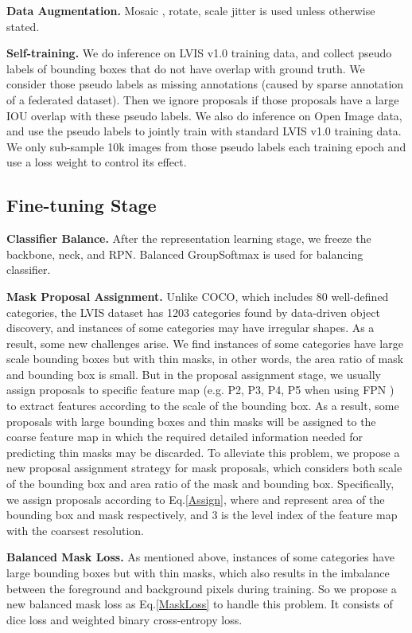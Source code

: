 \documentclass[runningheads]{llncs}
\begin{document}
 \noindent \textbf{Data Augmentation.} Mosaic \cite{bochkovskiy2020yolov4}, rotate, scale jitter is used unless otherwise stated.
 
 \noindent \textbf{Self-training.} 
 We do inference on LVIS v1.0 training data, and collect pseudo labels of bounding boxes that do not have overlap with ground truth. We consider those pseudo labels as missing annotations (caused by sparse annotation of a federated dataset). Then we ignore proposals if those proposals have a large IOU overlap with these pseudo labels. We also do inference on Open Image data, and use the pseudo labels to jointly train with standard LVIS v1.0 training data. We only sub-sample 10k images from those pseudo labels each training epoch and use a loss weight  to control its effect.
 
 \subsection{Fine-tuning Stage}
 
 \noindent \textbf{Classifier Balance.} After the representation learning stage, we freeze the backbone, neck, and RPN. Balanced GroupSoftmax \cite{li2020overcoming} is used for balancing classifier.
 
 \noindent \textbf{Mask Proposal Assignment.}  Unlike COCO, which includes 80 well-defined categories, the LVIS dataset has 1203 categories found by data-driven object discovery, and instances of some categories may have irregular shapes. As a result, some new challenges arise. We find instances of some categories have large scale bounding boxes but with thin masks, in other words, the area ratio of mask and bounding box is small. But in the proposal assignment stage, we usually assign proposals to specific feature map (e.g. P2, P3, P4, P5 when using FPN \cite{lin2017feature}) to extract features according to the scale of the bounding box. As a result, some proposals with large bounding boxes and thin masks will be assigned to the coarse feature map in which the required detailed information needed for predicting thin masks may be discarded. To alleviate this problem, we propose a new proposal assignment strategy for mask proposals, which considers both scale of the bounding box and area ratio of the mask and bounding box. Specifically, we assign proposals according to Eq.\ref{Assign}, where  and  represent area of the bounding box and mask respectively, and 3 is the level index of the feature map with the coarsest resolution.
 
 
 \noindent \textbf{Balanced Mask Loss.}
 As mentioned above, instances of some categories have large bounding boxes but with thin masks, which also results in the imbalance between the foreground and background pixels during training. So we propose a new balanced mask loss as Eq.\ref{MaskLoss} to handle this problem. It consists of dice loss \cite{milletari2016v} and weighted binary cross-entropy loss.
\end{document}
